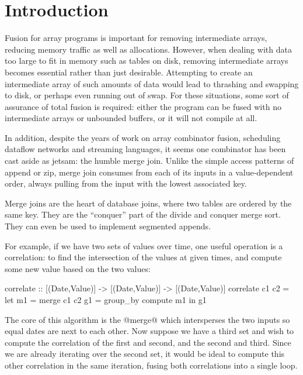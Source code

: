 \section{Introduction}
\label{s:Introduction}

Fusion for array programs is important for removing intermediate arrays, reducing memory traffic as well as allocations.
However, when dealing with data too large to fit in memory such as tables on disk, removing intermediate arrays becomes essential rather than just desirable.
Attempting to create an intermediate array of such amounts of data would lead to thrashing and swapping to disk, or perhaps even running out of swap.
For these situations, some sort of assurance of total fusion is required: either the program can be fused with no intermediate arrays or unbounded buffers, or it will not compile at all.

In addition, despite the years of work on array combinator fusion, scheduling dataflow networks and streaming languages, it seems one combinator has been cast aside as jetsam: the humble merge join.
Unlike the simple access patterns of append or zip, merge join consumes from each of its inputs in a value-dependent order, always pulling from the input with the lowest associated key.

Merge joins are the heart of database joins, where two tables are ordered by the same key.
They are the ``conquer'' part of the divide and conquer merge sort.
They can even be used to implement segmented appends.


For example, if we have two sets of values over time, one useful operation is a correlation: to find the intersection of the values at given times, and compute some new value based on the two values:
\begin{code}
correlate :: [(Date,Value)] -> [(Date,Value)]
          -> [(Date,Value)]
correlate c1 c2
 = let m1 = merge c1 c2
       g1 = group_by compute m1
   in  g1
\end{code}

The core of this algorithm is the @merge@ which intersperses the two inputs so equal dates are next to each other.
Now suppose we have a third set and wish to compute the correlation of the first and second, and the second and third.
Since we are already iterating over the second set, it would be ideal to compute this other correlation in the same iteration, fusing both correlations into a single loop.

